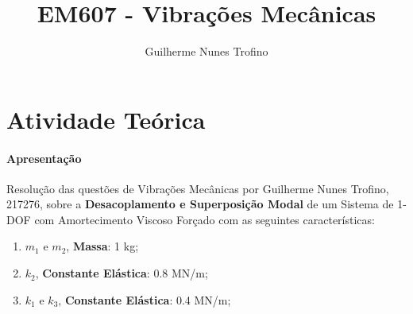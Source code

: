 \documentclass{article}
\title{EM607 - Vibrações Mecânicas}
\author{Guilherme Nunes Trofino}
\begin{document}
    \maketitle
\newpage

\section{Atividade Teórica}
\paragraph{Apresentação}Resolução das questões de Vibrações Mecânicas por Guilherme Nunes Trofino, 217276, sobre a \textbf{Desacoplamento e Superposição Modal} de um Sistema de 1-DOF com Amortecimento Viscoso Forçado com as seguintes características:
\begin{enumerate}[noitemsep]
    \item $m_1$ e $m_2$, \textbf{Massa}: 1 kg;
    \item $k_2$, \textbf{Constante Elástica}: 0.8 MN/m;
    \item $k_1$ e $k_3$, \textbf{Constante Elástica}: 0.4 MN/m;
\end{enumerate}
\end{document}

